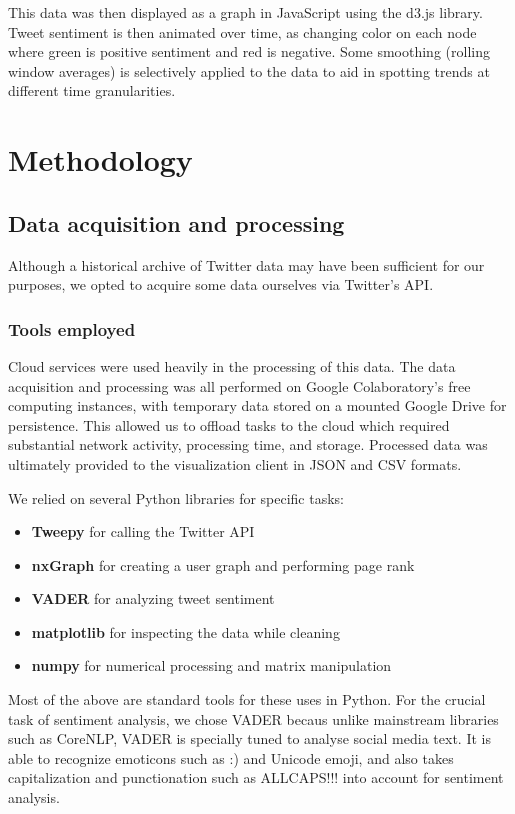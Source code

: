 \documentclass[11pt]{article}
\begin{document}
This data was then displayed as a graph in JavaScript using the d3.js library. Tweet sentiment is then animated over time, as changing color on each node where green is positive sentiment and red is negative. Some smoothing (rolling window averages) is selectively applied to the data to aid in spotting trends at different time granularities.


\section{Methodology}

\subsection{Data acquisition and processing}

Although a historical archive of Twitter data may have been sufficient for our purposes, we opted to acquire some data ourselves via Twitter's API.

\subsubsection{Tools employed}

Cloud services were used heavily in the processing of this data. The data acquisition and processing was all performed on Google Colaboratory's free computing instances, with temporary data stored on a mounted Google Drive for persistence. This allowed us to offload tasks to the cloud which required substantial network activity, processing time, and storage. Processed data was ultimately provided to the visualization client in JSON and CSV formats.\newline

We relied on several Python libraries for specific tasks:
\begin{itemize}
    \item \textbf{Tweepy} for calling the Twitter API
    \item \textbf{nxGraph} for creating a user graph and performing page rank
    \item \textbf{VADER} for analyzing tweet sentiment
    \item \textbf{matplotlib} for inspecting the data while cleaning
    \item \textbf{numpy} for numerical processing and matrix manipulation
\end{itemize}

Most of the above are standard tools for these uses in Python. For the crucial task of sentiment analysis, we chose VADER becaus unlike mainstream libraries such as CoreNLP, VADER is specially tuned to analyse social media text. It is able to recognize emoticons such as :) and Unicode emoji, and also takes capitalization and punctionation such as ALLCAPS!!! into account for sentiment analysis.\newline
\end{document}

